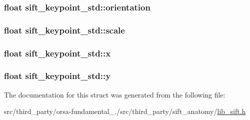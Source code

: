 \subsubsection[{orientation}]{\setlength{\rightskip}{0pt plus 5cm}float sift\+\_\+keypoint\+\_\+std\+::orientation}\label{structsift__keypoint__std_a051615675ebd98b52a13c7f6503bf6b9}
\hypertarget{structsift__keypoint__std_a6ed987c3fa9393bbb3ab906e566c1530}{}
\subsubsection[{scale}]{\setlength{\rightskip}{0pt plus 5cm}float sift\+\_\+keypoint\+\_\+std\+::scale}\label{structsift__keypoint__std_a6ed987c3fa9393bbb3ab906e566c1530}
\hypertarget{structsift__keypoint__std_ab3cf39ec4cada825754a69652dc112a4}{}
\subsubsection[{x}]{\setlength{\rightskip}{0pt plus 5cm}float sift\+\_\+keypoint\+\_\+std\+::x}\label{structsift__keypoint__std_ab3cf39ec4cada825754a69652dc112a4}
\hypertarget{structsift__keypoint__std_abeeba76576b2f6987cfef077385fdb38}{}
\subsubsection[{y}]{\setlength{\rightskip}{0pt plus 5cm}float sift\+\_\+keypoint\+\_\+std\+::y}\label{structsift__keypoint__std_abeeba76576b2f6987cfef077385fdb38}


The documentation for this struct was generated from the following file\+:\begin{DoxyCompactItemize}
\item 
src/third\+\_\+party/orsa-\/fundamental\+\_./src/third\+\_\+party/sift\+\_\+anatomy/\hyperlink{lib__sift_8h}{lib\+\_\+sift.\+h}\end{DoxyCompactItemize}
